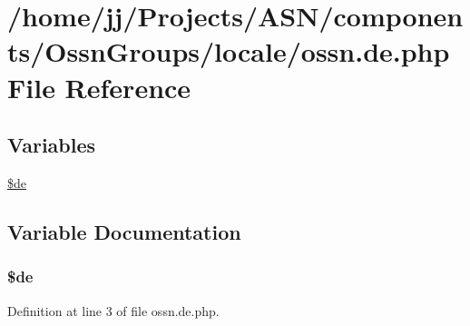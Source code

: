\hypertarget{components_2_ossn_groups_2locale_2ossn_8de_8php}{}\section{/home/jj/\+Projects/\+A\+S\+N/components/\+Ossn\+Groups/locale/ossn.de.\+php File Reference}
\label{components_2_ossn_groups_2locale_2ossn_8de_8php}
\subsection*{Variables}
\begin{DoxyCompactItemize}
\item 
\hyperlink{components_2_ossn_groups_2locale_2ossn_8de_8php_aab7de7e51b4580005f63dd4cf5e17311}{\$de}
\end{DoxyCompactItemize}


\subsection{Variable Documentation}
\subsubsection[{\texorpdfstring{\$de}{$de}}]{\setlength{\rightskip}{0pt plus 5cm}\$de}\hypertarget{components_2_ossn_groups_2locale_2ossn_8de_8php_aab7de7e51b4580005f63dd4cf5e17311}{}\label{components_2_ossn_groups_2locale_2ossn_8de_8php_aab7de7e51b4580005f63dd4cf5e17311}


Definition at line 3 of file ossn.\+de.\+php.

